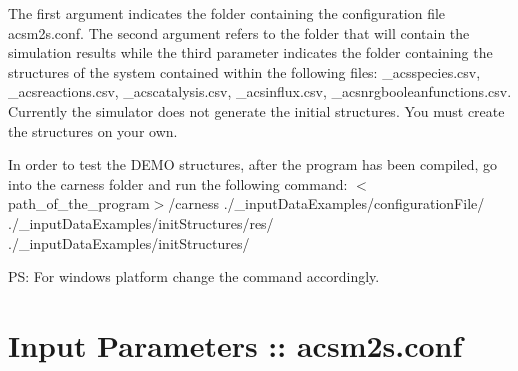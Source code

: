 The first argument indicates the folder containing the configuration file acsm2s.\-conf. The second argument refers to the folder that will contain the simulation results while the third parameter indicates the folder containing the structures of the system contained within the following files\-: \-\_\-acsspecies.\-csv, \-\_\-acsreactions.\-csv, \-\_\-acscatalysis.\-csv, \-\_\-acsinflux.\-csv, \-\_\-acsnrgbooleanfunctions.\-csv. Currently the simulator does not generate the initial structures. You must create the structures on your own.

In order to test the D\-E\-M\-O structures, after the program has been compiled, go into the carness folder and run the following command\-: {\ttfamily } $<$path\-\_\-of\-\_\-the\-\_\-program$>$/carness {\ttfamily }./\-\_\-input\-Data\-Examples/configuration\-File/ {\ttfamily }./\-\_\-input\-Data\-Examples/init\-Structures/res/ {\ttfamily }./\-\_\-input\-Data\-Examples/init\-Structures/

P\-S\-: For windows platform change the command accordingly.

\par
\par
 \hypertarget{a00002_parameters}{}\section{Input Parameters \-:: acsm2s.\-conf}\label{a00002_parameters}


